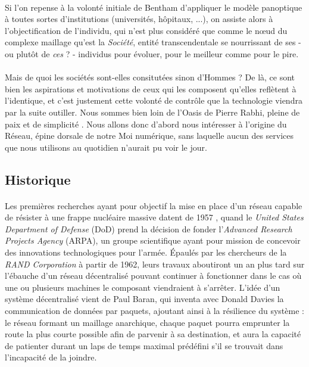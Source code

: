 \paragraph{} Si l'on repense à la volonté initiale de Bentham d'appliquer le modèle panoptique à toutes sortes d'institutions
(universités, hôpitaux, ...), on assiste alors à l'objectification de l'individu, qui n'est plus considéré que comme le 
n\oe{}ud du complexe maillage qu'est la \emph{Société}, entité transcendentale se nourrissant de ses - ou plutôt de 
\emph{ces} ? - individus pour évoluer, pour le meilleur comme pour le pire.

\paragraph{} Mais de quoi les sociétés sont-elles consitutées sinon d'Hommes ? De là, ce sont bien les aspirations et 
motivations de ceux qui les composent qu'elles reflètent à l'identique, et c'est justement cette volonté de contrôle que
la technologie viendra par la suite outiller. Nous sommes bien loin de l'Oasis de Pierre Rabhi, pleine de paix et de
simplicité \cite{Rabhi1}. Nous allons donc d'abord nous intéresser à l'origine du Réseau, épine dorsale de notre Moi 
numérique, sans laquelle aucun des services que nous utilisons au quotidien n'aurait pu voir le jour.


\subsection*{Historique}

\paragraph{} Les premières recherches ayant pour objectif la mise en place d'un réseau capable de résister à une frappe
nucléaire massive datent de 1957 \cite{Internet0}, quand le \emph{United States Department of Defense} (DoD) prend la
décision de fonder l'\emph{Advanced Research Projects Agency} (ARPA), un groupe scientifique ayant pour mission de concevoir
des innovations technologiques pour l'armée. Épaulés par les chercheurs de la \emph{RAND Corporation} à partir de 1962,
leurs travaux aboutiront un an plus tard sur l'ébauche d'un réseau décentralisé pouvant continuer à fonctionner dans le
cas où une ou plusieurs machines le composant viendraient à s'arrêter. L'idée d'un système décentralisé vient de Paul Baran,
qui inventa avec Donald Davies la communication de données par paquets, ajoutant ainsi à la résilience du système : le réseau
formant un maillage anarchique, chaque paquet pourra emprunter la route la plus courte possible afin de parvenir à sa 
destination, et aura la capacité de patienter durant un laps de temps maximal prédéfini s'il se trouvait dans l'incapacité
de la joindre.

